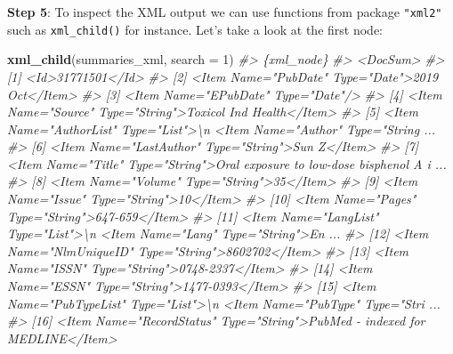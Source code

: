 \documentclass[
]{book}
\newenvironment{Shaded}{\begin{snugshade}}{\end{snugshade}}
\newcommand{\AttributeTok}[1]{\textcolor[rgb]{0.13,0.29,0.53}{#1}}
\newcommand{\CommentTok}[1]{\textcolor[rgb]{0.56,0.35,0.01}{\textit{#1}}}
\newcommand{\DecValTok}[1]{\textcolor[rgb]{0.00,0.00,0.81}{#1}}
\newcommand{\FunctionTok}[1]{\textcolor[rgb]{0.13,0.29,0.53}{\textbf{#1}}}
\newcommand{\NormalTok}[1]{#1}
\begin{document}
\textbf{Step 5}: To inspect the XML output we can use functions from package \texttt{"xml2"}
such as \texttt{xml\_child()} for instance. Let's take a look at the first node:

\begin{Shaded}
\begin{Highlighting}[]
\FunctionTok{xml\_child}\NormalTok{(summaries\_xml, }\AttributeTok{search =} \DecValTok{1}\NormalTok{)}
\CommentTok{\#\textgreater{} \{xml\_node\}}
\CommentTok{\#\textgreater{} \textless{}DocSum\textgreater{}}
\CommentTok{\#\textgreater{}  [1] \textless{}Id\textgreater{}31771501\textless{}/Id\textgreater{}}
\CommentTok{\#\textgreater{}  [2] \textless{}Item Name="PubDate" Type="Date"\textgreater{}2019 Oct\textless{}/Item\textgreater{}}
\CommentTok{\#\textgreater{}  [3] \textless{}Item Name="EPubDate" Type="Date"/\textgreater{}}
\CommentTok{\#\textgreater{}  [4] \textless{}Item Name="Source" Type="String"\textgreater{}Toxicol Ind Health\textless{}/Item\textgreater{}}
\CommentTok{\#\textgreater{}  [5] \textless{}Item Name="AuthorList" Type="List"\textgreater{}\textbackslash{}n  \textless{}Item Name="Author" Type="String ...}
\CommentTok{\#\textgreater{}  [6] \textless{}Item Name="LastAuthor" Type="String"\textgreater{}Sun Z\textless{}/Item\textgreater{}}
\CommentTok{\#\textgreater{}  [7] \textless{}Item Name="Title" Type="String"\textgreater{}Oral exposure to low{-}dose bisphenol A i ...}
\CommentTok{\#\textgreater{}  [8] \textless{}Item Name="Volume" Type="String"\textgreater{}35\textless{}/Item\textgreater{}}
\CommentTok{\#\textgreater{}  [9] \textless{}Item Name="Issue" Type="String"\textgreater{}10\textless{}/Item\textgreater{}}
\CommentTok{\#\textgreater{} [10] \textless{}Item Name="Pages" Type="String"\textgreater{}647{-}659\textless{}/Item\textgreater{}}
\CommentTok{\#\textgreater{} [11] \textless{}Item Name="LangList" Type="List"\textgreater{}\textbackslash{}n  \textless{}Item Name="Lang" Type="String"\textgreater{}En ...}
\CommentTok{\#\textgreater{} [12] \textless{}Item Name="NlmUniqueID" Type="String"\textgreater{}8602702\textless{}/Item\textgreater{}}
\CommentTok{\#\textgreater{} [13] \textless{}Item Name="ISSN" Type="String"\textgreater{}0748{-}2337\textless{}/Item\textgreater{}}
\CommentTok{\#\textgreater{} [14] \textless{}Item Name="ESSN" Type="String"\textgreater{}1477{-}0393\textless{}/Item\textgreater{}}
\CommentTok{\#\textgreater{} [15] \textless{}Item Name="PubTypeList" Type="List"\textgreater{}\textbackslash{}n  \textless{}Item Name="PubType" Type="Stri ...}
\CommentTok{\#\textgreater{} [16] \textless{}Item Name="RecordStatus" Type="String"\textgreater{}PubMed {-} indexed for MEDLINE\textless{}/Item\textgreater{}}

\end{Highlighting}
\end{Shaded}
\end{document}
